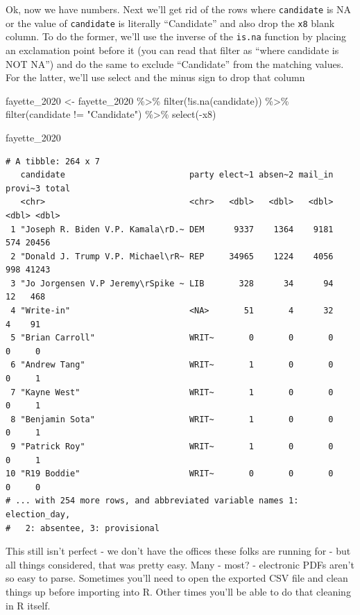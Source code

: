 \documentclass[
  letterpaper,
  DIV=11,
  numbers=noendperiod]{scrreprt}
\newenvironment{Shaded}{\begin{snugshade}}{\end{snugshade}}
\newcommand{\FunctionTok}[1]{\textcolor[rgb]{0.28,0.35,0.67}{#1}}
\newcommand{\NormalTok}[1]{\textcolor[rgb]{0.00,0.23,0.31}{#1}}
\newcommand{\OtherTok}[1]{\textcolor[rgb]{0.00,0.23,0.31}{#1}}
\newcommand{\SpecialCharTok}[1]{\textcolor[rgb]{0.37,0.37,0.37}{#1}}
\newcommand{\StringTok}[1]{\textcolor[rgb]{0.13,0.47,0.30}{#1}}
\begin{document}
Ok, now we have numbers. Next we'll get rid of the rows where
\texttt{candidate} is NA or the value of \texttt{candidate} is literally
``Candidate'' and also drop the \texttt{x8} blank column. To do the
former, we'll use the inverse of the \texttt{is.na} function by placing
an exclamation point before it (you can read that filter as ``where
candidate is NOT NA'') and do the same to exclude ``Candidate'' from the
matching values. For the latter, we'll use select and the minus sign to
drop that column

\begin{Shaded}
\begin{Highlighting}[]
\NormalTok{fayette\_2020 }\OtherTok{\textless{}{-}}\NormalTok{ fayette\_2020 }\SpecialCharTok{\%\textgreater{}\%} \FunctionTok{filter}\NormalTok{(}\SpecialCharTok{!}\FunctionTok{is.na}\NormalTok{(candidate)) }\SpecialCharTok{\%\textgreater{}\%} \FunctionTok{filter}\NormalTok{(candidate }\SpecialCharTok{!=} \StringTok{"Candidate"}\NormalTok{) }\SpecialCharTok{\%\textgreater{}\%} \FunctionTok{select}\NormalTok{(}\SpecialCharTok{{-}}\NormalTok{x8)}

\NormalTok{fayette\_2020}
\end{Highlighting}
\end{Shaded}

\begin{verbatim}
# A tibble: 264 x 7
   candidate                         party elect~1 absen~2 mail_in provi~3 total
   <chr>                             <chr>   <dbl>   <dbl>   <dbl>   <dbl> <dbl>
 1 "Joseph R. Biden V.P. Kamala\rD.~ DEM      9337    1364    9181     574 20456
 2 "Donald J. Trump V.P. Michael\rR~ REP     34965    1224    4056     998 41243
 3 "Jo Jorgensen V.P Jeremy\rSpike ~ LIB       328      34      94      12   468
 4 "Write-in"                        <NA>       51       4      32       4    91
 5 "Brian Carroll"                   WRIT~       0       0       0       0     0
 6 "Andrew Tang"                     WRIT~       1       0       0       0     1
 7 "Kayne West"                      WRIT~       1       0       0       0     1
 8 "Benjamin Sota"                   WRIT~       1       0       0       0     1
 9 "Patrick Roy"                     WRIT~       1       0       0       0     1
10 "R19 Boddie"                      WRIT~       0       0       0       0     0
# ... with 254 more rows, and abbreviated variable names 1: election_day,
#   2: absentee, 3: provisional
\end{verbatim}

This still isn't perfect - we don't have the offices these folks are
running for - but all things considered, that was pretty easy. Many -
most? - electronic PDFs aren't so easy to parse. Sometimes you'll need
to open the exported CSV file and clean things up before importing into
R. Other times you'll be able to do that cleaning in R itself.
\end{document}
